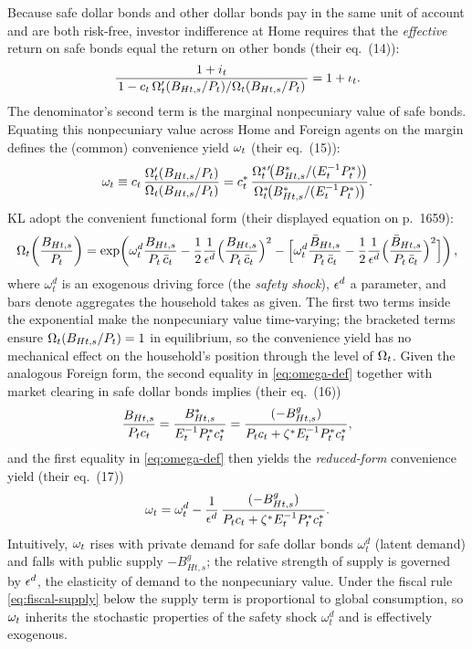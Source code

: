 Because safe dollar bonds and other dollar bonds pay in the same unit of account
and are both risk-free, investor indifference at Home requires that the
\emph{effective} return on safe bonds equal the return on other bonds
(their eq.~(14)):
\begin{equation}
\label{eq:wedge}
\frac{1+i_t}{\,1-c_t\,\Omega_t'(B_{Ht,s}/P_t)/\Omega_t(B_{Ht,s}/P_t)\,}=1+\iota_t.
\end{equation}
The denominator's second term is the marginal nonpecuniary value of safe bonds.
Equating this nonpecuniary value across Home and Foreign agents on the margin
defines the (common) convenience yield $\omega_t$ (their eq.~(15)):
\begin{equation}
\label{eq:omega-def}
\omega_t\equiv c_t\,\frac{\Omega_t'(B_{Ht,s}/P_t)}{\Omega_t(B_{Ht,s}/P_t)}
=c_t^{*}\,\frac{\Omega_t^{*}{}'\!\bigl(B^{*}_{Ht,s}/(E_t^{-1}P^{*}_t)\bigr)}
{\Omega_t^{*}\!\bigl(B^{*}_{Ht,s}/(E_t^{-1}P^{*}_t)\bigr)}.
\end{equation}
KL adopt the convenient functional form (their displayed equation on p.~1659):
\begin{equation}
\label{eq:Omega-form}
\Omega_t\!\left(\frac{B_{Ht,s}}{P_t}\right)
=\exp\!\left(\omega^d_t\frac{B_{Ht,s}}{P_t\,\bar c_t}
-\frac12\frac1{\epsilon^{d}}\Bigl(\frac{B_{Ht,s}}{P_t\,\bar c_t}\Bigr)^{2}
-\Bigl[\omega^d_t\frac{\bar B_{Ht,s}}{P_t\,\bar c_t}
-\frac12\frac1{\epsilon^{d}}\Bigl(\frac{\bar B_{Ht,s}}{P_t\,\bar c_t}\Bigr)^{2}\Bigr]\right),
\end{equation}
where $\omega^d_t$ is an exogenous driving force (the \emph{safety shock}),
$\epsilon^{d}$ a parameter, and bars denote aggregates the household takes as given. The
first two terms inside the exponential make the nonpecuniary value
time-varying; the bracketed terms ensure $\Omega_t(B_{Ht,s}/P_t)=1$ in
equilibrium, so the convenience yield has no mechanical effect on the
household's position through the level of $\Omega_t$. Given the analogous Foreign
form, the second equality in \eqref{eq:omega-def} together with market clearing
in safe dollar bonds implies (their eq.~(16))
\begin{equation}
\label{eq:safe-bond-clearing}
\frac{B_{Ht,s}}{P_t c_t}=\frac{B^{*}_{Ht,s}}{E_t^{-1}P^{*}_t c^{*}_t}
=\frac{(-B^g_{Ht,s})}{P_t c_t+\zeta^{*} E_t^{-1}P^{*}_t c^{*}_t},
\end{equation}
and the first equality in \eqref{eq:omega-def} then yields the
\emph{reduced-form} convenience yield (their eq.~(17))
\begin{equation}
\label{eq:omega-reduced}
\omega_t=\omega^d_t-\frac1{\epsilon^{d}}\,
\frac{(-B^g_{Ht,s})}{P_t c_t+\zeta^{*} E_t^{-1}P^{*}_t c^{*}_t}.
\end{equation}
Intuitively, $\omega_t$ rises with private demand for safe dollar bonds
$\omega^d_t$ (latent demand) and falls with public supply $-B^g_{Ht,s}$; the
relative strength of supply is governed by $\epsilon^{d}$, the elasticity of demand to
the nonpecuniary value. Under the fiscal rule \eqref{eq:fiscal-supply} below the
supply term is proportional to global consumption, so $\omega_t$ inherits the
stochastic properties of the safety shock $\omega^d_t$ and is effectively
exogenous.

